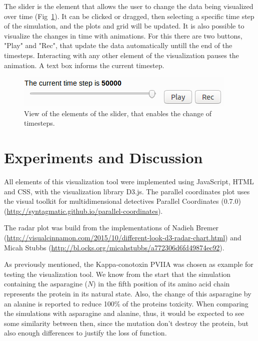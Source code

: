 \documentclass[10pt, conference]{IEEEtran}
\begin{document}
The slider is the element that allows the user to change the data being visualized over time (Fig~\ref{fig:slider}). It can be clicked or dragged, then selecting a specific time step of the simulation, and the plots and grid will be updated. It is also possible to visualize the changes in time with animations. For this there are two buttons, "Play" and "Rec", that update the data automatically untill the end of the timesteps. Interacting with any other element of the visualization pauses the animation. A text box informs the current timestep.

\begin{figure}
\includegraphics[width=0.8\linewidth]{figs/slider.png}
\caption{View of the elements of the slider, that enables the change of timesteps.} 
\label{fig:slider}
\end{figure}

\section{Experiments and Discussion}
%

All elements of this visualization tool were implemented using JavaScript, HTML and CSS, with the visualization library D3.js. The parallel coordinates plot uses the visual toolkit for multidimensional detectives Parallel Coordinates (0.7.0) (\url{http://syntagmatic.github.io/parallel-coordinates}). 

The radar plot was build from the implementations of Nadieh Bremer (\url{http://visualcinnamon.com/2015/10/different-look-d3-radar-chart.html}) and Micah Stubbs (\url{http://bl.ocks.org/micahstubbs/a772306d6fd49874ec92}). 

As previously mentioned, the Kappa-conotoxin PVIIA was chosen as example for testing the visualization tool. We know from the start that the simulation containing the asparagine ($N$) in the fifth position of its amino acid chain represents the protein in its natural state. Also, the change of this asparagine by an alanine is reported to reduce 100\% of the proteins toxicity. When comparing the simulations with asparagine and alanine, thus, it would be expected to see some similarity between then, since the mutation don't destroy the protein, but also enough differences to justify the loss of function. 
\end{document}
